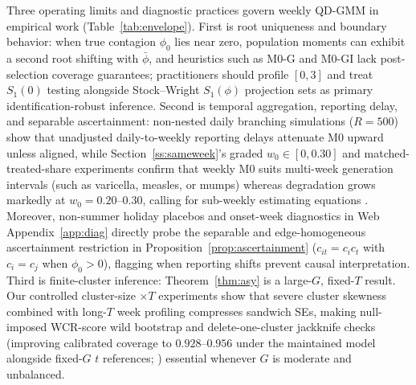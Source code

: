 Three operating limits and diagnostic practices govern weekly QD-GMM in empirical work
(Table~\ref{tab:envelope}). First is root uniqueness and boundary behavior: when true contagion
$\phi_0$ lies near zero, population moments can exhibit a second root shifting with $\bar\phi$, and
heuristics such as M0-G and M0-GI lack post-selection coverage guarantees; practitioners should
profile $[0,3]$ and treat $S_1(0)$ testing alongside Stock--Wright $S_1(\phi)$ projection sets
\citep{stock2000weak,kleibergen2005testing,andrews2017subvector,cox2026simple} as primary
identification-robust inference. Second is temporal aggregation, reporting delay, and separable
ascertainment: non-nested daily branching simulations ($R=500$) show that unadjusted daily-to-weekly
reporting delays attenuate M0 upward unless aligned, while Section~\ref{ss:sameweek}'s graded
$w_0\in[0,0.30]$ and matched-treated-share experiments confirm that weekly M0 suits multi-week
generation intervals (such as varicella, measles, or mumps) whereas degradation grows markedly at
$w_0=0.20$--$0.30$, calling for sub-weekly estimating equations \citep{lison2024nowcast}. Moreover,
non-summer holiday placebos and onset-week diagnostics in Web Appendix~\ref{app:diag} directly probe
the separable and edge-homogeneous ascertainment restriction in Proposition~\ref{prop:ascertainment}
($c_{it}=c_ic_t$ with $c_i=c_j$ when $\phi_0>0$), flagging when reporting shifts prevent causal
interpretation. Third is finite-cluster inference: Theorem~\ref{thm:asy} is a large-$G$, fixed-$T$
result. Our controlled cluster-size $\times T$ experiments show that severe cluster skewness
combined with long-$T$ week profiling compresses sandwich SEs, making null-imposed WCR-score wild
bootstrap \citep{cameron2008bootstrap,kline2012score,webb2023reworking} and delete-one-cluster
jackknife checks \citep{mackinnon2023guide,mackinnon2023jackknife} (improving calibrated coverage
to $0.928$--$0.956$ under the maintained model alongside fixed-$G$ $t$ references;
\citealp{hwang2021simple,ferman2019inference,canay2021wild}) essential whenever $G$ is moderate and
unbalanced.

